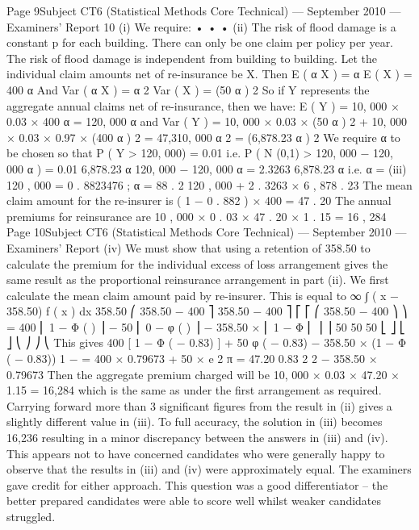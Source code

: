 Page 9Subject CT6 (Statistical Methods Core Technical) — September 2010 — Examiners’ Report
10
(i)
We require:
•
•
•
(ii)
The risk of flood damage is a constant p for each building.
There can only be one claim per policy per year.
The risk of flood damage is independent from building to building.
Let the individual claim amounts net of re-insurance be X. Then
E ( α X ) = α E ( X ) = 400 α
And Var ( α X ) = α 2 Var ( X ) = (50 α ) 2
So if Y represents the aggregate annual claims net of re-insurance, then we
have:
E ( Y ) = 10, 000 × 0.03 × 400 α = 120, 000 α
and
Var ( Y ) = 10, 000 × 0.03 × (50 α ) 2 + 10, 000 × 0.03 × 0.97 × (400 α ) 2 = 47,310, 000 α 2
= (6,878.23 α ) 2
We require α to be chosen so that
P ( Y > 120, 000) = 0.01
i.e. P ( N (0,1) >
120, 000 − 120, 000 α
) = 0.01
6,878.23 α
120, 000 − 120, 000 α
= 2.3263
6,878.23 α
i.e. α =
(iii)
120 , 000
= 0 . 8823476 ; α = 88 . 2 %
120 , 000 + 2 . 3263 × 6 , 878 . 23
The mean claim amount for the re-insurer is ( 1 − 0 . 882 ) × 400 = 47 . 20
The annual premiums for reinsurance are 10 , 000 × 0 . 03 × 47 . 20 × 1 . 15 = 16 , 284
Page 10Subject CT6 (Statistical Methods Core Technical) — September 2010 — Examiners’ Report
(iv)
We must show that using a retention of 358.50 to calculate the premium for
the individual excess of loss arrangement gives the same result as the
proportional reinsurance arrangement in part (ii).
We first calculate the mean claim amount paid by re-insurer. This is equal to
∞
∫
( x − 358.50) f ( x ) dx
358.50
⎛
358.50 − 400 ⎤
358.50 − 400 ⎤
⎡
⎡
⎛ 358.50 − 400 ⎞ ⎞
= 400 ⎢ 1 − Φ (
) ⎥ − 50 ⎢ 0 − φ (
) ⎥ − 358.50 × ⎜ 1 − Φ ⎜
⎟ ⎟
50
50
50
⎣
⎦
⎣
⎦
⎝
⎠ ⎠
⎝
This gives
400 [ 1 − Φ ( − 0.83) ] + 50 φ ( − 0.83) − 358.50 × (1 − Φ ( − 0.83))
1 −
= 400 × 0.79673 + 50 ×
e
2 π
= 47.20
0.83 2
2
− 358.50 × 0.79673
Then the aggregate premium charged will be 10, 000 × 0.03 × 47.20 × 1.15 =
16,284 which is the same as under the first arrangement as required.
Carrying forward more than 3 significant figures from the result in (ii) gives a slightly
different value in (iii). To full accuracy, the solution in (iii) becomes 16,236 resulting in a
minor discrepancy between the answers in (iii) and (iv). This appears not to have concerned
candidates who were generally happy to observe that the results in (iii) and (iv) were
approximately equal. The examiners gave credit for either approach.
This question was a good differentiator – the better prepared candidates were able to score
well whilst weaker candidates struggled.
